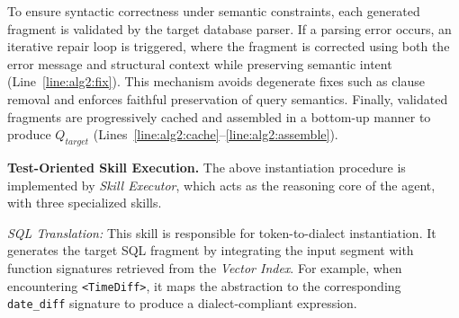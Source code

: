 \documentclass[sigconf,review,anonymous]{acmart}
\begin{document}

To ensure syntactic correctness under semantic constraints, each generated fragment is validated by the target database parser. If a parsing error occurs, an iterative repair loop is triggered, where the fragment is corrected using both the error message and structural context while preserving semantic intent (Line~\ref{line:alg2:fix}). This mechanism avoids degenerate fixes such as clause removal and enforces faithful preservation of query semantics.
Finally, validated fragments are progressively cached and assembled in a bottom-up manner to produce $Q_{target}$ (Lines~\ref{line:alg2:cache}--\ref{line:alg2:assemble}).

\textbf{Test-Oriented Skill Execution.} The above instantiation procedure is implemented by \textit{Skill Executor},
which acts as the reasoning core of the agent, with three specialized skills.

\textit{SQL Translation:} This skill is responsible for token-to-dialect instantiation. It generates the target SQL fragment by integrating the input segment with function signatures retrieved from the \textit{Vector Index}. For example, when encountering \texttt{<TimeDiff>}, it maps the abstraction to the corresponding \duckdb{} \texttt{date\_diff} signature to produce a dialect-compliant expression.
\end{document}
